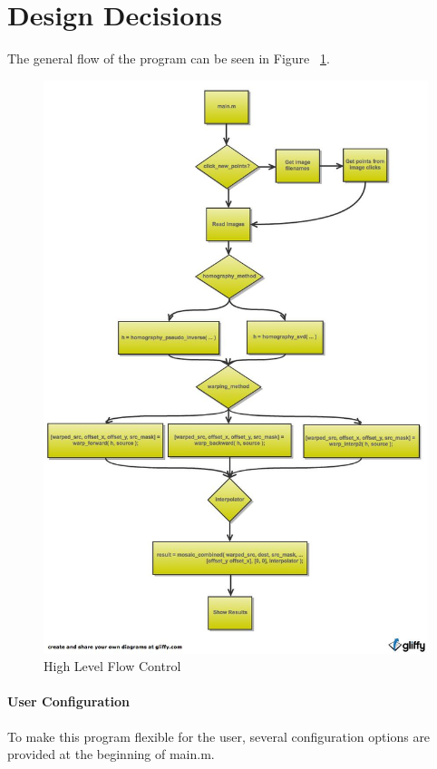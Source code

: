 \documentclass[11pt, letterpaper]{article}
\begin{document}
\section{Design Decisions}
The general flow of the program can be seen in Figure ~\ref{fig:flowChart}.

\begin{figure}[here]
\includegraphics[width=.8\textwidth]{./flowchart.jpg}
\caption{High Level Flow Control}
\label{fig:flowChart}
\end{figure}

\paragraph{User Configuration}
To make this program flexible for the user, several configuration
options are provided at the beginning of main.m.
\end{document}
